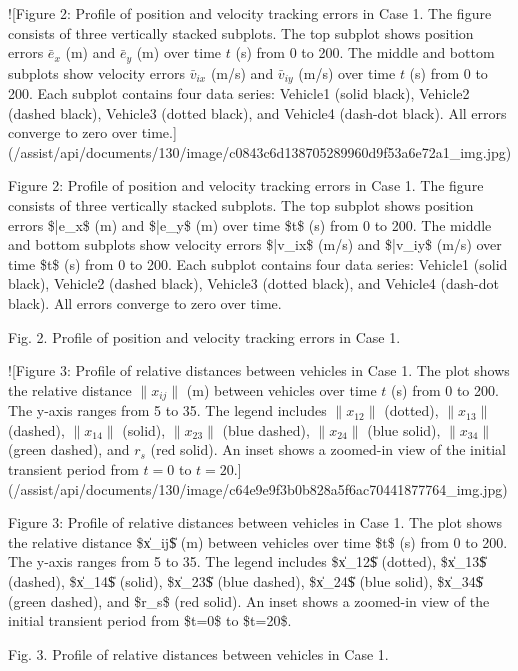 ![Figure 2: Profile of position and velocity tracking errors in Case 1. The figure consists of three vertically stacked subplots. The top subplot shows position errors $\bar{e}_x$ (m) and $\bar{e}_y$ (m) over time $t$ (s) from 0 to 200. The middle and bottom subplots show velocity errors $\bar{v}_{ix}$ (m/s) and $\bar{v}_{iy}$ (m/s) over time $t$ (s) from 0 to 200. Each subplot contains four data series: Vehicle1 (solid black), Vehicle2 (dashed black), Vehicle3 (dotted black), and Vehicle4 (dash-dot black). All errors converge to zero over time.](/assist/api/documents/130/image/c0843c6d138705289960d9f53a6e72a1_img.jpg)

Figure 2: Profile of position and velocity tracking errors in Case 1. The figure consists of three vertically stacked subplots. The top subplot shows position errors \$\bar{e}\_x\$ (m) and \$\bar{e}\_y\$ (m) over time \$t\$ (s) from 0 to 200. The middle and bottom subplots show velocity errors \$\bar{v}\_{ix}\$ (m/s) and \$\bar{v}\_{iy}\$ (m/s) over time \$t\$ (s) from 0 to 200. Each subplot contains four data series: Vehicle1 (solid black), Vehicle2 (dashed black), Vehicle3 (dotted black), and Vehicle4 (dash-dot black). All errors converge to zero over time.

Fig. 2. Profile of position and velocity tracking errors in Case 1.

![Figure 3: Profile of relative distances between vehicles in Case 1. The plot shows the relative distance $\|x_{ij}\|$ (m) between vehicles over time $t$ (s) from 0 to 200. The y-axis ranges from 5 to 35. The legend includes $\|x_{12}\|$ (dotted), $\|x_{13}\|$ (dashed), $\|x_{14}\|$ (solid), $\|x_{23}\|$ (blue dashed), $\|x_{24}\|$ (blue solid), $\|x_{34}\|$ (green dashed), and $r_s$ (red solid). An inset shows a zoomed-in view of the initial transient period from $t=0$ to $t=20$.](/assist/api/documents/130/image/c64e9e9f3b0b828a5f6ac70441877764_img.jpg)

Figure 3: Profile of relative distances between vehicles in Case 1. The plot shows the relative distance \$\|x\_{ij}\|\$ (m) between vehicles over time \$t\$ (s) from 0 to 200. The y-axis ranges from 5 to 35. The legend includes \$\|x\_{12}\|\$ (dotted), \$\|x\_{13}\|\$ (dashed), \$\|x\_{14}\|\$ (solid), \$\|x\_{23}\|\$ (blue dashed), \$\|x\_{24}\|\$ (blue solid), \$\|x\_{34}\|\$ (green dashed), and \$r\_s\$ (red solid). An inset shows a zoomed-in view of the initial transient period from \$t=0\$ to \$t=20\$.

Fig. 3. Profile of relative distances between vehicles in Case 1.

